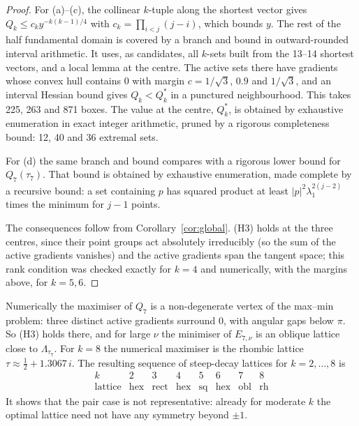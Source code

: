 \documentclass[10pt,twocolumn,a4paper]{article}
\theoremstyle{definition}
\begin{document}
\begin{proof}
For (a)--(c), the collinear $k$-tuple along the shortest vector gives $Q_k\le c_ky^{-k(k-1)/4}$ with $c_k=\prod_{i<j}(j-i)$, which bounds $y$. The rest of the half fundamental domain is covered by a branch and bound in outward-rounded interval arithmetic. It uses, as candidates, all $k$-sets built from the 13--14 shortest vectors, and a local lemma at the centre. The active sets there have gradients whose convex hull contains $0$ with margin $c=1/\sqrt3$, $0.9$ and $1/\sqrt3$, and an interval Hessian bound gives $Q_k<Q_k^*$ in a punctured neighbourhood. This takes 225, 263 and 871 boxes. The value at the centre, $Q_k^*$, is obtained by exhaustive enumeration in exact integer arithmetic, pruned by a rigorous completeness bound: 12, 40 and 36 extremal sets.

For (d) the same branch and bound compares with a rigorous lower bound for $Q_7(\tau_7)$. That bound is obtained by exhaustive enumeration, made complete by a recursive bound: a set containing $p$ has squared product at least $|p|^2\lambda_1^{2(j-2)}$ times the minimum for $j-1$ points.

The consequences follow from Corollary~\ref{cor:global}. (H3) holds at the three centres, since their point groups act absolutely irreducibly (so the sum of the active gradients vanishes) and the active gradients span the tangent space; this rank condition was checked exactly for $k=4$ and numerically, with the margins above, for $k=5,6$.
\end{proof}

Numerically the maximiser of $Q_7$ is a non-degenerate vertex of the max--min problem: three distinct active gradients surround $0$, with angular gaps below $\pi$. So (H3) holds there, and for large $\nu$ the minimiser of $E_{7,\nu}$ is an oblique lattice close to $\Lambda_{\tau_7}$. For $k=8$ the numerical maximiser is the rhombic lattice $\tau\approx\frac12+1.3067\,i$. The resulting sequence of steep-decay lattices for $k=2,\dots,8$ is
\[\begin{array}{c|ccccccc}k&2&3&4&5&6&7&8\\\hline\text{lattice}&\text{hex}&\text{rect}&\text{hex}&\text{sq}&\text{hex}&\text{obl}&\text{rh}\end{array}\]
It shows that the pair case is not representative: already for moderate $k$ the optimal lattice need not have any symmetry beyond $\pm1$.
\end{document}

